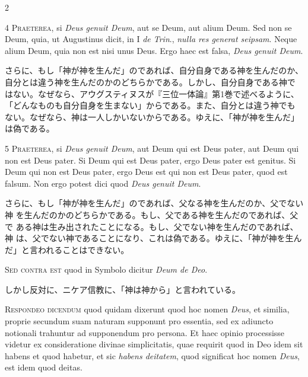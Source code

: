 \documentclass[paper=a4paper,fontsize=10pt,jafontsize=9pt,titlepage]{jlreq}
\begin{document}
\begin{paracol}{2}
\switchcolumn*

4 {\scshape Praeterea}, si {\itshape Deus genuit Deum}, aut se Deum, aut alium Deum. Sed non se
Deum, quia, ut Augustinus dicit, in I {\itshape de Trin}., {\itshape nulla res generat
seipsam}. Neque alium Deum, quia non est nisi unus Deus. Ergo haec est
falsa, {\itshape Deus genuit Deum}.

\switchcolumn

さらに、もし「神が神を生んだ」のであれば、自分自身である神を生んだのか、
 自分とは違う神を生んだのかのどちらかである。しかし、自分自身である神で
 はない。なぜなら、アウグスティヌスが『三位一体論』第1巻で述べるように、
 「どんなものも自分自身を生まない」からである。また、自分とは違う神でも
 ない。なぜなら、神は一人しかいないからである。ゆえに、「神が神を生んだ」
 は偽である。

\switchcolumn*

5 {\scshape Praeterea}, si {\itshape Deus genuit Deum}, aut Deum qui est Deus pater, aut Deum
qui non est Deus pater. Si Deum qui est Deus pater, ergo Deus pater est
genitus. Si Deum qui non est Deus pater, ergo Deus est qui non est Deus
pater, quod est falsum. Non ergo potest dici quod {\itshape Deus genuit Deum}.

\switchcolumn

さらに、もし「神が神を生んだ」のであれば、父なる神を生んだのか、父でない神
 を生んだのかのどちらかである。もし、父である神を生んだのであれば、父で
 ある神は生み出されたことになる。もし、父でない神を生んだのであれば、神
 は、父でない神であることになり、これは偽である。ゆえに、「神が神を生ん
 だ」と言われることはできない。

\switchcolumn*

{\scshape Sed contra est} quod in Symbolo dicitur {\itshape Deum de Deo}.

\switchcolumn

しかし反対に、ニケア信教に、「神は神から」と言われている。

\switchcolumn*

{\scshape Respondeo dicendum} quod quidam dixerunt quod hoc nomen \textit{Deus}, et similia,
proprie secundum suam naturam supponunt pro essentia, sed ex adiuncto
notionali trahuntur ad supponendum pro persona. Et haec opinio
processisse videtur ex consideratione divinae simplicitatis, quae
requirit quod in Deo idem sit habens et quod habetur, et sic \textit{habens
deitatem}, quod significat hoc nomen \textit{Deus}, est idem quod deitas.

\switchcolumn


\end{paracol}
\end{document}
